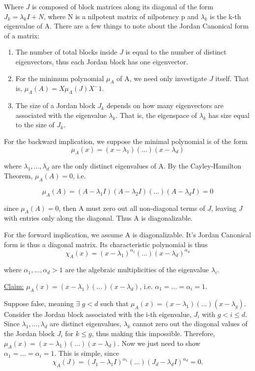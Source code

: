 \documentclass[12pt]{article}
\newcommand{\hop}{\vspace{1mm}}
\newcommand{\jump}{\vspace{5mm}}
\newcommand{\lm}{\lambda}
\begin{document}
\begin{enumerate}[leftmargin=\labelsep]
\begin{enumerate}
Where $J$ is composed of block matrices along its diagonal of the form $J_k = \lm_kI + N$, where N is a nilpotent matrix of nilpotency p and $\lm_k$ is the k-th eigenvalue of A. There are a few things to note about the Jordan Canonical form of a matrix:
\begin{enumerate}
    \item The number of total blocks inside $J$ is equal to the number of distinct eigenvectors, thus each Jordan block has one eigenvector. 
    \item For the minimum polynomial $\mu_A$ of A, we need only investigate $J$ itself. That is, $\mu_A(A) = X\mu_A(J)X^-1$.
    \item The size of a Jordan block $J_k$ depends on how many eigenvectors are associated with the eigenvalue $\lm_k$. That is, the eigenspace of $\lm_k$ has size equal to the size of $J_k$.  
\end{enumerate}

For the backward implication, we suppose the minimal polynomial is of the form 
\[
\mu_A(x) = (x - \lm_1)(...)(x - \lm_d)
\]

where $\lm_1, ..., \lm_d$ are the only distinct eigenvalues of A. By the Cayley-Hamilton Theorem, $\mu_A(A) = 0$, i.e.

\[
\mu_A(A) = (A - \lm_1I)(A-\lm_2I)(...)(A - \lm_dI) = 0
\]

since $\mu_A(A) = 0$, then A must zero out all non-diagonal terms of $J$, leaving $J$ with entries only along the diagonal. Thus A is diagonalizable. 

\hop
For the forward implication, we assume A is diagonalizable. It's Jordan Canonical form is thus a diagonal matrix. Its characteristic polynomial is thus
\[
\chi_A(x) = (x - \lm_1)^{\alpha_1}(...)(x - \lm_d)^{\alpha_d}
\]

where $\alpha_1,..., \alpha_d > 1$ are the algebraic multiplicities of the eigenvalue $\lm_i$. 

\jump
\underline{Claim:} $\mu_A(x) = (x -\lm_1)(...)(x - \lm_d)$, i.e. $\alpha_1 = ... = \alpha_i = 1$.

\jump
Suppose false, meaning $\exists$ $g < d$ such that $\mu_A(x) = (x -\lm_1)(...)(x - \lm_g)$. Consider the Jordan block associated with the i-th eigenvalue, $J_i$ with $g < i \leq d$. Since $\lm_1,..., \lm_d$ are distinct eigenvalues, $\lm_k$ cannot zero out the diagonal values of the Jordan block $J_i$ for $k \leq g$, thus making this impossible. Therefore, $\mu_A(x) = (x -\lm_1)(...)(x - \lm_d)$. Now we just need to show $\alpha_1 = ... = \alpha_i = 1$. This is simple, since 
\[
\chi_A(J) = (J_1 - \lm_1I)^{\alpha_1}(...)(J_d - \lm_dI)^{\alpha_d} = 0.
\]


\end{enumerate}
\end{enumerate}
\end{document}
